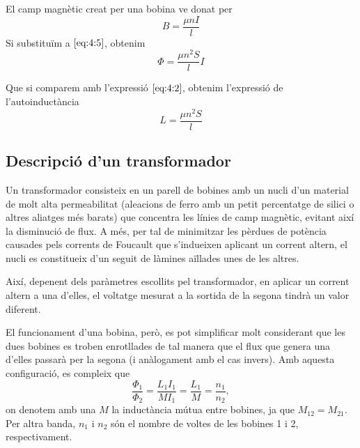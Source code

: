\documentclass[a4paper,10.5pt]{report}
\begin{document}
El camp magnètic creat per una bobina ve donat per 
\begin{equation}
	B = \frac{\mu n I}{l}
\end{equation}
Si substituïm a $\ref{eq:4:5}$, obtenim
\begin{equation}
	\Phi = \frac{\mu n^2 S}{l} I
\end{equation}

Que si comparem amb l'expressió $\ref{eq:4:2}$, obtenim l'expressió de l'autoinductància
\begin{equation}
	L = \frac{\mu n^2 S}{l}
	\label{eq:4:100}
\end{equation}

\subsection{Descripció d'un transformador}
Un transformador consisteix en un parell de bobines amb un nucli d'un material de molt alta permeabilitat (aleacions de ferro amb un petit percentatge de silici o altres aliatges més barats) que concentra les línies de camp magnètic, evitant així la disminució de flux. A més, per tal de minimitzar les pèrdues de potència causades pels corrents de Foucault que s'indueixen aplicant un corrent altern, el nucli es constitueix d'un seguit de làmines aïllades unes de les altres. 

Així, depenent dels paràmetres escollits pel transformador, en aplicar un corrent altern a una d'elles, el voltatge mesurat a la sortida de la segona tindrà un valor diferent.

El funcionament d'una bobina, però, es pot simplificar molt considerant que les dues bobines es troben enrotllades de tal manera que el flux que genera una d'elles passarà per la segona (i anàlogament amb el cas invers). Amb aquesta configuració, es compleix que
\begin{equation}
	\frac{\Phi_1}{\Phi_2}=\frac{L_1I_1}{MI_1}=\frac{L_1}{M}=\frac{n_1}{n_2}, \label{eq:4:8}
\end{equation}
on denotem amb una $M$ la inductància mútua entre bobines, ja que $M_{12}=M_{21}$. Per altra banda, $n_1$ i $n_2$ són el nombre de voltes de les bobines 1 i 2, respectivament.
\end{document}
